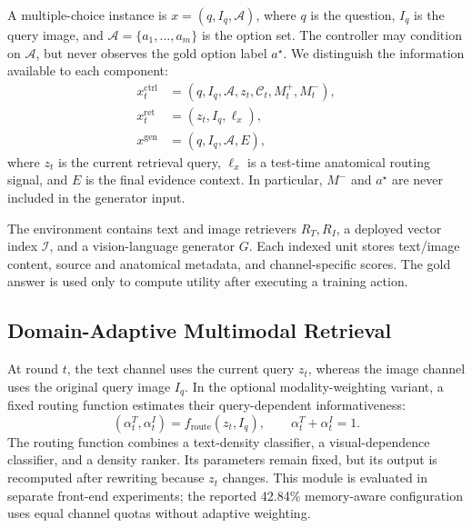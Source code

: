 A multiple-choice instance is $x=(q,I_q,\mathcal{A})$, where $q$ is the
question, $I_q$ is the query image, and
$\mathcal{A}=\{a_1,\ldots,a_m\}$ is the option set. The controller may
condition on $\mathcal{A}$, but never observes the gold option label
$a^\star$. We distinguish the information available to each component:
\begin{equation}
\begin{aligned}
 x^{\mathrm{ctrl}}_t &=(q,I_q,\mathcal{A},z_t,\mathcal{C}_t,M_t^+,M_t^-),\\
 x^{\mathrm{ret}}_t  &=(z_t,I_q,\ell_x),\\
 x^{\mathrm{gen}}    &=(q,I_q,\mathcal{A},E),
\end{aligned}
\label{eq:component-inputs}
\end{equation}
where $z_t$ is the current retrieval query, $\ell_x$ is a test-time
anatomical routing signal, and $E$ is the final evidence context. In
particular, $M^-$ and $a^\star$ are never included in the generator input.

The environment contains text and image retrievers $R_T,R_I$, a deployed
vector index $\mathcal{I}$, and a vision-language generator $G$. Each indexed
unit stores text/image content, source and anatomical metadata, and
channel-specific scores. The gold answer is used only to compute utility after
executing a training action.

\subsection{Domain-Adaptive Multimodal Retrieval}
\label{sec:environment}

At round $t$, the text channel uses the current query $z_t$, whereas the image
channel uses the original query image $I_q$. In the optional modality-weighting
variant, a fixed routing function estimates their query-dependent
informativeness:
\begin{equation}
 (\alpha_t^T,\alpha_t^I)=f_{\mathrm{route}}(z_t,I_q),\qquad
 \alpha_t^T+\alpha_t^I=1.
 \label{eq:modality-weights}
\end{equation}
The routing function combines a text-density classifier, a visual-dependence
classifier, and a density ranker. Its parameters remain fixed, but its output is
recomputed after rewriting because $z_t$ changes. This module is evaluated in
separate front-end experiments; the reported 42.84\% memory-aware
configuration uses equal channel quotas without adaptive weighting.

